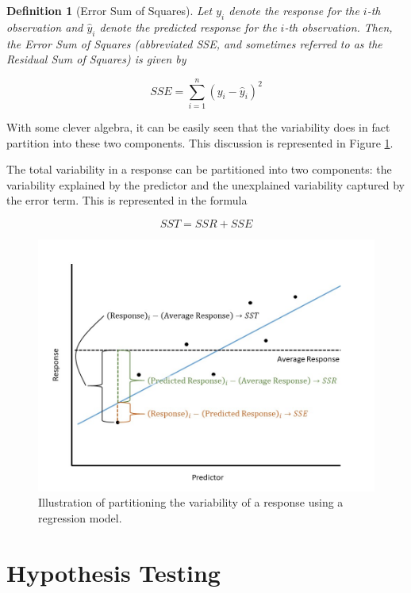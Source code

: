\documentclass[
]{book}
\theoremstyle{plain}
\theoremstyle{mydefn}
\newtheorem{definition}{Definition}[chapter]
\theoremstyle{myexmpl}
\theoremstyle{remark}
\begin{document}
\begin{definition}[Error Sum of Squares]
\protect\hypertarget{def:defn-sse}{}{\label{def:defn-sse} {} }Let \(y_i\) denote the response for the \(i\)-th observation and \(\widehat{y}_i\) denote the predicted response for the \(i\)-th observation. Then, the Error Sum of Squares (abbreviated SSE, and sometimes referred to as the Residual Sum of Squares) is given by

\[SSE = \sum_{i=1}^{n} \left(y_i - \widehat{y}_i\right)^2\]
\end{definition}

With some clever algebra, it can be easily seen that the variability does in fact partition into these two components. This discussion is represented in Figure \ref{fig:regquality-partition-variability}.

\begin{rmdkeyidea}
The total variability in a response can be partitioned into two components: the variability explained by the predictor and the unexplained variability captured by the error term. This is represented in the formula

\[SST = SSR + SSE\]
\end{rmdkeyidea}

\begin{figure}

{\centering \includegraphics[width=0.8\linewidth]{./images/RegQuality-Partitioning-Variability} 

}

\caption{Illustration of partitioning the variability of a response using a regression model.}\label{fig:regquality-partition-variability}
\end{figure}

\hypertarget{hypothesis-testing}{%
\section{Hypothesis Testing}\label{hypothesis-testing}}
\end{document}
